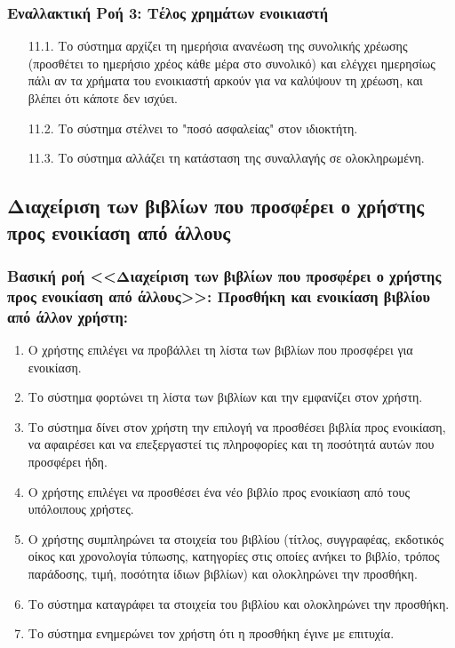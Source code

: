 \documentclass[12pt,a4paper]{article}
\begin{document}
\subsubsection*{Εναλλακτική Ροή 3: Τέλος χρημάτων ενοικιαστή}
\begin{enumerate}
    \item[11.1.] Το σύστημα αρχίζει τη ημερήσια ανανέωση της συνολικής χρέωσης (προσθέτει το ημερήσιο χρέος κάθε μέρα στο συνολικό) και ελέγχει ημερησίως πάλι αν τα χρήματα του ενοικιαστή αρκούν για να καλύψουν τη χρέωση, και βλέπει ότι κάποτε δεν ισχύει.
    \item[11.2.] Το σύστημα στέλνει το "ποσό ασφαλείας" στον ιδιοκτήτη.
    \item[11.3.] Το σύστημα αλλάζει τη κατάσταση της συναλλαγής σε ολοκληρωμένη.
\end{enumerate}

\subsection{Διαχείριση των βιβλίων που προσφέρει ο χρήστης προς ενοικίαση από άλλους}

\subsubsection*{Βασική ροή <<Διαχείριση των βιβλίων που προσφέρει ο χρήστης \\προς ενοικίαση από άλλους>>: Προσθήκη και ενοικίαση βιβλίου από άλλον χρήστη:}
\begin{enumerate}
    \item Ο χρήστης επιλέγει να προβάλλει τη λίστα των βιβλίων που προσφέρει για ενοικίαση.
    \item Το σύστημα φορτώνει τη λίστα των βιβλίων και την εμφανίζει στον χρήστη.
    \item Το σύστημα δίνει στον χρήστη την επιλογή να προσθέσει βιβλία προς ενοικίαση, να αφαιρέσει και να επεξεργαστεί τις πληροφορίες και τη ποσότητά αυτών που προσφέρει ήδη.
    \item Ο χρήστης επιλέγει να προσθέσει ένα νέο βιβλίο προς ενοικίαση από τους υπόλοιπους χρήστες.
    \item Ο χρήστης συμπληρώνει τα στοιχεία του βιβλίου (τίτλος, συγγραφέας, εκδοτικός οίκος και χρονολογία τύπωσης, κατηγορίες στις οποίες ανήκει το βιβλίο, τρόπος παράδοσης, τιμή, ποσότητα ίδιων βιβλίων) και ολοκληρώνει την προσθήκη.
    \item Το σύστημα καταγράφει τα στοιχεία του βιβλίου και ολοκληρώνει την προσθήκη.
    \item Το σύστημα ενημερώνει τον χρήστη ότι η προσθήκη έγινε με επιτυχία.
\end{enumerate}
\end{document}
